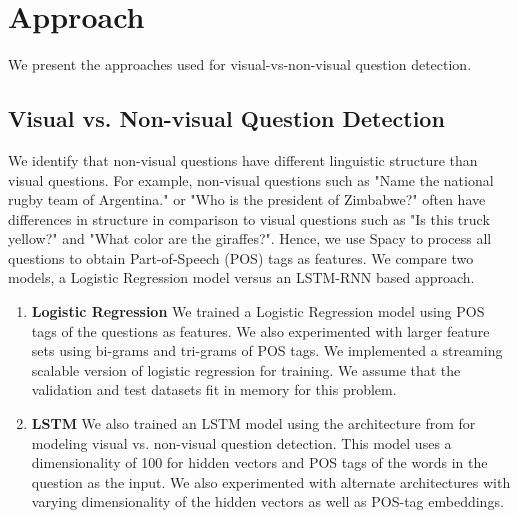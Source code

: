 \section{Approach}
We present the approaches used for visual-vs-non-visual question detection.

\subsection{Visual vs. Non-visual Question Detection}
We identify that non-visual questions have different linguistic structure than visual questions. For example, non-visual questions such as "Name the national rugby team of Argentina." or "Who is the president of Zimbabwe?" often have differences in structure in comparison to visual questions such as "Is this truck yellow?" and "What color are the giraffes?". Hence, we use Spacy \cite{spacy} to process all questions to obtain Part-of-Speech (POS) tags as features. We compare two models, a Logistic Regression model versus an LSTM-RNN based approach.

\begin{enumerate}
\item \textbf{Logistic Regression} We trained a Logistic Regression model using POS tags of the questions as features. We also experimented with larger feature sets using bi-grams and tri-grams of POS tags. We implemented a streaming scalable version of logistic regression for training. We assume that the validation and test datasets fit in memory for this problem. 

\item \textbf{LSTM} We also trained an LSTM model using the architecture from \cite{ray2016question} for modeling visual vs. non-visual question detection. This model uses a dimensionality of 100 for hidden vectors and POS tags of the words in the question as the input. We also experimented with alternate architectures with varying dimensionality of the hidden vectors as well as POS-tag embeddings.
\end{enumerate}

